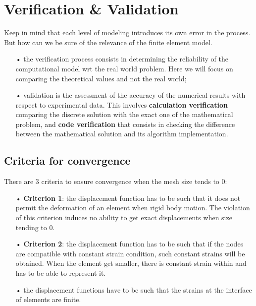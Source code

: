 
\chapter{Verification \& Validation}
	Keep in mind that each level of modeling introduces its own error in the process. But how can we be sure of the relevance of the finite element model. 
	
	\begin{itemize}
	\item[•] the verification process consists in determining the reliability of the computational model wrt the real world problem. Here we will focus on comparing the theoretical values and not the real world;
	
	\item[•] validation is the assessment of the accuracy of the numerical results with respect to experimental data. This involves \textbf{calculation verification} comparing the discrete solution with the exact one of the mathematical problem, and \textbf{code verification} that consists in checking the difference between the mathematical solution and its algorithm implementation. 
	\end{itemize}
	
\section{Criteria for convergence}	
	There are 3 criteria to ensure convergence when the mesh size tends to 0: 
	
	\begin{itemize}
	\item[•] \textbf{Criterion 1}: the displacement function has to be such that it does not permit the deformation of an element when rigid body motion. The violation  of this criterion induces no ability to get exact displacements when size tending to 0.\\
	\item[•] \textbf{Criterion 2}: the displacement function has to be such that if the nodes are compatible with constant strain condition, such constant strains will be obtained. When the element get smaller, there is constant strain within and has to be able to represent it. \\

	\item[•] the displacement functions have to be such that the strains at the interface of elements are finite. \\
	\end{itemize}
	
